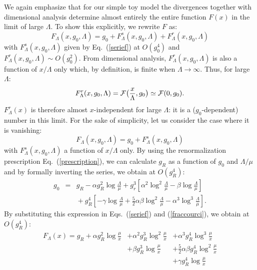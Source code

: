 \documentclass[floatfix,twocolumn,preprintnumbers,amsmath,amssymb,prb]{revtex4}
\begin{document}
We again emphasize that for our simple toy model the divergences
together with dimensional analysis determine almost entirely the
entire function $F(x)$ in the limit of large
$\Lambda$. To show this explicitly, we rewrite
$F$ as:
\begin{equation}
F_\Lambda(x,g_0,\Lambda)= g_0 + F_\Lambda^s(x,g_0,\Lambda)+ F_\Lambda^r(x,g_0,\Lambda)
\label{decomposition}
\end{equation}
with $F_\Lambda^s(x,g_0,\Lambda)$ given by Eq.~(\ref{serief}) at
$O(g_0^4)$ and $F_\Lambda^r(x,g_0,\Lambda)\sim O(g_0^2)$. From
dimensional analysis, $F_\Lambda^r(x,g_0,\Lambda)$ is also a
function of $x/\Lambda$ only which, by definition, is finite when
$\Lambda\to\infty$. Thus, for large $\Lambda$:
\begin{equation}
F_\Lambda^r(x,g_0,\Lambda)= {\cal
F}\big(\frac{x}{\Lambda},g_0\big)\simeq {\cal F}(0,g_0).
\end{equation}
$F_\Lambda^r(x)$ is therefore almost $x$-independent for large
$\Lambda$: it is a ($g_0$-dependent) number in this limit. For the
sake of simplicity, let us consider the case where it is vanishing:
\begin{equation}
F_\Lambda(x,g_0,\Lambda)= g_0 + F_\Lambda^s(x,g_0,\Lambda)
\label{fraccourci}
\end{equation}
with $F_\Lambda^s(x,g_0,\Lambda)$ a function of $x/\Lambda$ only.
By using the renormalization prescription
Eq.~(\ref{prescription}), we can calculate $g_R$ as a function of
$g_0$ and $\Lambda/\mu$ and by formally inverting the series, we
obtain at $O(g_R^4)$:
\begin{eqnarray}
g_0&=& g_R -\alpha g_R^2 \log \frac{\Lambda}{\mu}
+g_r^3 [\alpha^2 \log^2 \frac{\Lambda}{\mu} - 
\beta \log \frac{\Lambda}{\mu}] \nonumber \\
&&{} + g_R^4[-\gamma \log \frac{\Lambda}{\mu} +\frac{5}{2}
\alpha\beta \log^2 \frac{\Lambda}{\mu} -\alpha^3 \log^3
\frac{\Lambda}{\mu}].
\end{eqnarray}
By substituting this expression in Eqs.~(\ref{serief}) and
(\ref{fraccourci}), we obtain at $O(g_R^4)$:
\begin{equation}
\begin{array}{lll}
F_{\Lambda}(x)=g_R+{\displaystyle\alpha g_R^2\log\frac{\mu}{x}} 
       &{\displaystyle+ \alpha^2 g_R^3 \log^2\frac{\mu}{x}} &{\displaystyle+\alpha^3g_R^4 \log^3\frac{\mu}{x}} \\
       &{\displaystyle+  \beta g_R^3 \log\frac{\mu}{x}}     &{\displaystyle+\frac{5}{2}\alpha\beta g_R^4\log^2\frac{\mu}{x}}\\
       &                                                        &{\displaystyle+\gamma g_R^4\log\frac{\mu}{x}}
\end{array}
\label{Ftot_ren}
\end{equation}
\end{document}
